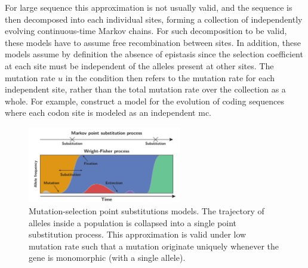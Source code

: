 For large sequence this approximation is not usually valid, and the sequence is then decomposed into each individual sites, forming a collection of independently evolving continuous-time Markov chains.
For such decomposition to be valid, these models have to assume free \gls{recombination} between sites.
In addition, these models assume by definition the absence of epistasis since the selection coefficient at each site must be independent of the alleles present at other sites. 
The mutation rate $u$ in the condition then refers to the mutation rate for each independent site, rather than the total mutation rate over the collection as a whole.
For example, \citet{Halpern1998} construct a model for the evolution of coding sequences where each \gls{codon} site is modeled as an independent \gls{mc}. 

\begin{figure}[thbp!]
	\centering
	\includegraphics[width=0.6\textwidth]{figures/point-process.pdf}
	\caption[Mutation-selection point substitutions]{Mutation-selection point substitutions models. The trajectory of alleles inside a population is collapsed into a single point \gls{substitution} process. This approximation is valid under low mutation rate such that a mutation originate uniquely whenever the gene is monomorphic (with a single allele).}
\end{figure}

